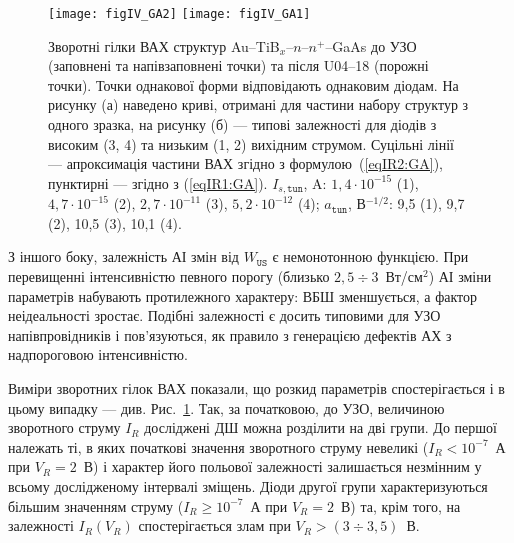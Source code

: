 \documentclass[a4paper,14pt,oneside,openany]{memoir}
\begin{document}
\begin{figure}
\center
\texttt{[image: figIV\_GA2]} \hfill
\texttt{[image: figIV\_GA1]}
\caption{\label{figIV_GA}
Зворотні гілки ВАХ структур Au--TiB$_x$--$n$--$n^+$--GaAs
до УЗО (заповнені та напівзаповнені точки)
та після U04--18 (порожні точки).
Точки однакової форми відповідають однаковим діодам.
На рисунку (а) наведено криві, отримані для частини набору структур з одного зразка,
на рисунку (б) --- типові залежності для діодів з високим (3, 4) та низьким (1, 2)
вихідним струмом.
Суцільні лінії --- апроксимація частини ВАХ згідно з формулою~(\ref{eqIR2:GA}),
пунктирні  --- згідно з (\ref{eqIR1:GA}).
$I_{s,\mathtt{tun}}$, A: $1,4\cdot10^{-15}$ (1), $4,7\cdot10^{-15}$ (2), $2,7\cdot10^{-11}$ (3), $5,2\cdot10^{-12}$ (4);
$a_\mathtt{tun}$, В$^{-1/2}$: 9,5 (1), 9,7 (2), 10,5 (3), 10,1 (4).
}%
\end{figure}

З іншого боку, залежність АІ змін від $W_\mathtt{US}$ є немонотонною функцією.
При перевищенні інтенсивністю певного порогу (близько $2,5\div3$~Вт/см$^2$) АІ зміни параметрів набувають
протилежного характеру:  ВБШ зменшується, а фактор неідеальності зростає.
Подібні залежності є досить типовими для УЗО напівпровідників \cite{Zdeb1989,Zaver,Zaver2005}
і пов'язуються, як правило з генерацією дефектів АХ з надпороговою інтенсивністю.



Виміри зворотних гілок ВАХ показали, що розкид параметрів спостерігається і в цьому випадку ---
див. Рис.~\ref{figIV_GA}.
Так, за початковою, до УЗО, величиною зворотного струму $I_R$ досліджені ДШ можна розділити на дві групи.
До першої належать ті, в яких початкові значення зворотного струму невеликі ($I_R<10^{-7}$~А
при $V_R=2$~В) і характер його
польової залежності залишається незмінним у всьому дослідженому інтервалі зміщень.
Діоди другої групи характеризуються більшим значенням струму ($I_R\geq10^{-7}$~А при $V_R=2$~В) та, крім того, на залежності $I_R(V_R)$ спостерігається злам при $V_R>(3\div3,5)$~В.
\end{document}
